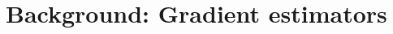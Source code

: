 \documentclass{article}
\begin{document}








\section{Background: Gradient estimators}
\end{document}
